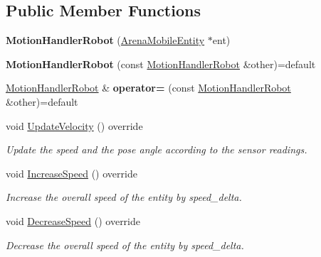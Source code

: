 \subsection*{Public Member Functions}
\begin{DoxyCompactItemize}
\item 
\mbox{\label{class_motion_handler_robot_a4b52a0b181837a8d63c39f71811d691b}} 
{\bfseries Motion\+Handler\+Robot} (\mbox{\hyperlink{class_arena_mobile_entity}{Arena\+Mobile\+Entity}} $\ast$ent)
\item 
\mbox{\label{class_motion_handler_robot_a66445cc9057e3ef9298b5bd239df6d4e}} 
{\bfseries Motion\+Handler\+Robot} (const \mbox{\hyperlink{class_motion_handler_robot}{Motion\+Handler\+Robot}} \&other)=default
\item 
\mbox{\label{class_motion_handler_robot_a48181f197ffb864f16e29721ad964e4a}} 
\mbox{\hyperlink{class_motion_handler_robot}{Motion\+Handler\+Robot}} \& {\bfseries operator=} (const \mbox{\hyperlink{class_motion_handler_robot}{Motion\+Handler\+Robot}} \&other)=default
\item 
void \mbox{\hyperlink{class_motion_handler_robot_acd2cdb615d806dcf809142e84569ca9d}{Update\+Velocity}} () override
\begin{DoxyCompactList}\small\item\em Update the speed and the pose angle according to the sensor readings. \end{DoxyCompactList}\item 
\mbox{\label{class_motion_handler_robot_a93ea16501b7b8c0bd78edb2681aa3b6d}} 
void \mbox{\hyperlink{class_motion_handler_robot_a93ea16501b7b8c0bd78edb2681aa3b6d}{Increase\+Speed}} () override
\begin{DoxyCompactList}\small\item\em Increase the overall speed of the entity by speed\+\_\+delta. \end{DoxyCompactList}\item 
\mbox{\label{class_motion_handler_robot_a89e9b8b4e22fb021d7d67c817e66b7b2}} 
void \mbox{\hyperlink{class_motion_handler_robot_a89e9b8b4e22fb021d7d67c817e66b7b2}{Decrease\+Speed}} () override
\begin{DoxyCompactList}\small\item\em Decrease the overall speed of the entity by speed\+\_\+delta. \end{DoxyCompactList}\item 

\end{DoxyCompactItemize}
